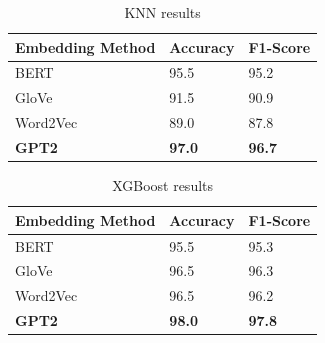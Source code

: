 \begin{table}[hbt!]
\begin{threeparttable}
\caption{KNN results}
\label{knn_results}
\begin{tabular}{lll}
\toprule
\headrow Embedding Method & Accuracy & F1-Score\\
\midrule
 BERT     &       95.5 &       95.2 \\
 GloVe    &       91.5 &       90.9 \\
 Word2Vec &       89.0 &       87.8 \\
 \textbf{GPT2}     &       \textbf{97.0}   &       \textbf{96.7} \\
\bottomrule
\end{tabular}
\end{threeparttable}
\end{table}

\begin{table}[hbt!]
\begin{threeparttable}
\caption{XGBoost results}
\label{xgb_results}
\begin{tabular}{lll}
\toprule
\headrow Embedding Method & Accuracy & F1-Score\\
\midrule
 BERT     &       95.5 &       95.3 \\
 GloVe    &       96.5 &       96.3 \\
 Word2Vec &       96.5 &       96.2 \\
 \textbf{GPT2}     &       \textbf{98.0}   &       \textbf{97.8} \\
\bottomrule
\end{tabular}
\end{threeparttable}
\end{table}

